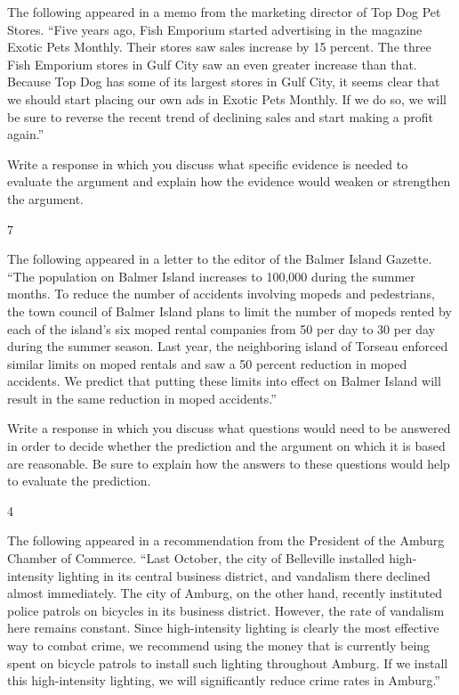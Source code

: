 \documentclass[]{article}
\begin{document}
The following appeared in a memo from the marketing director of Top Dog
Pet Stores. ``Five years ago, Fish Emporium started advertising in the
magazine Exotic Pets Monthly. Their stores saw sales increase by 15
percent. The three Fish Emporium stores in Gulf City saw an even greater
increase than that. Because Top Dog has some of its largest stores in
Gulf City, it seems clear that we should start placing our own ads in
Exotic Pets Monthly. If we do so, we will be sure to reverse the recent
trend of declining sales and start making a profit again.''

Write a response in which you discuss what specific evidence is needed
to evaluate the argument and explain how the evidence would weaken or
strengthen the argument.

7

The following appeared in a letter to the editor of the Balmer Island
Gazette. ``The population on Balmer Island increases to 100,000 during
the summer months. To reduce the number of accidents involving mopeds
and pedestrians, the town council of Balmer Island plans to limit the
number of mopeds rented by each of the island's six moped rental
companies from 50 per day to 30 per day during the summer season. Last
year, the neighboring island of Torseau enforced similar limits on moped
rentals and saw a 50 percent reduction in moped accidents. We predict
that putting these limits into effect on Balmer Island will result in
the same reduction in moped accidents.''

Write a response in which you discuss what questions would need to be
answered in order to decide whether the prediction and the argument on
which it is based are reasonable. Be sure to explain how the answers to
these questions would help to evaluate the prediction.

4

The following appeared in a recommendation from the President of the
Amburg Chamber of Commerce. ``Last October, the city of Belleville
installed high-intensity lighting in its central business district, and
vandalism there declined almost immediately. The city of Amburg, on the
other hand, recently instituted police patrols on bicycles in its
business district. However, the rate of vandalism here remains constant.
Since high-intensity lighting is clearly the most effective way to
combat crime, we recommend using the money that is currently being spent
on bicycle patrols to install such lighting throughout Amburg. If we
install this high-intensity lighting, we will significantly reduce crime
rates in Amburg.''
\end{document}
